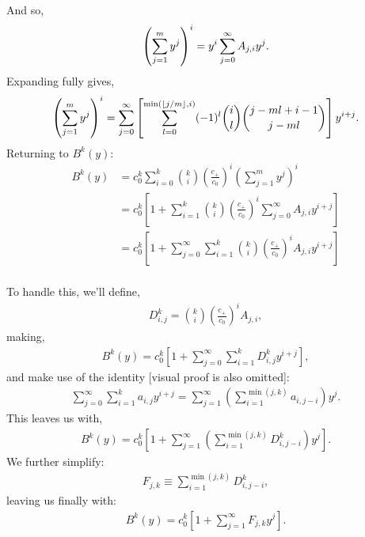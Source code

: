 	And so,
	\begin{equation}
		\left( \sum_{j=1}^m y^j \right)^i = y^i\sum_{j=0}^\infty A_{j, i}y^j. \\
	\end{equation}
	Expanding fully gives,
	\begin{equation}
		\left( \sum_{j=1}^m y^j \right)^i = \sum_{j=0}^\infty \left[ \sum_{l=0}^{\min(\lfloor j/m\rfloor, i)} (-1)^l {i \choose l} {j - ml + i - 1 \choose j - ml} \right]y^{i+j}. \\
	\end{equation}
	Returning to $B^k(y)$:
	\begin{align}
		B^k(y) &= c_0^k \sum_{i=0}^k {k \choose i}  \left(\frac{c_+}{c_0}\right)^i \left( \sum_{j=1}^m y^j\right)^i\\
		&= c_0^k  \left[ 1 + \sum_{i=1}^k {k \choose i}  \left(\frac{c_+}{c_0}\right)^i  \sum_{j=0}^\infty A_{j, i}y^{i+j}\right]\\
		&= c_0^k  \left[ 1 +  \sum_{j=0}^\infty\sum_{i=1}^k {k \choose i}  \left(\frac{c_+}{c_0}\right)^i  A_{j, i}y^{i+j}\right]\\
	\end{align}

	To handle this, we'll define,
	\begin{align}
		D_{i, j}^k = {k \choose i}  \left(\frac{c_+}{c_0}\right)^i  A_{j, i},
	\end{align}
	making,
	\begin{align}
		B^k(y) = c_0^k  \left[ 1 +  \sum_{j=0}^\infty\sum_{i=1}^k D_{i, j}^k y^{i+j}\right],
	\end{align}
	and make use of the identity [visual proof is also omitted]:
	\begin{align}
		\sum_{j=0}^\infty \sum_{i=1}^k a_{i, j} y^{i+j} = \sum_{j=1}^\infty\left( \sum_{i=1}^{\min(j, k)}a_{i, j-i} \right) y^j.
	\end{align}
	This leaves us with,
	\begin{align}
		B^k(y) = c_0^k  \left[ 1 +  \sum_{j=1}^\infty\left( \sum_{i=1}^{\min(j, k)}D_{i, j-i}^k \right) y^j\right].
	\end{align}
	We further simplify:
	\begin{align}
		F_{j, k} \equiv \sum_{i=1}^{\min(j, k)}D_{i, j-i}^k,
	\end{align}
	leaving us finally with:
	\begin{align}
		B^k(y) = c_0^k  \left[ 1 +  \sum_{j=1}^\infty F_{j, k} y^j\right].
	\end{align}


